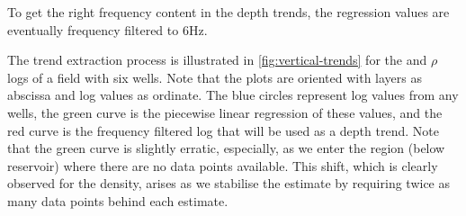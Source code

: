 To get the right frequency content in the depth trends, the regression
values are eventually frequency filtered to 6Hz.

The trend extraction process is illustrated in
\autoref{fig:vertical-trends} for the \vp and $\rho$ logs of a field
with six wells. Note that the plots are oriented with layers
as abscissa and log values as ordinate. The blue circles represent log
values from any wells, the green curve is the piecewise linear
regression of these values, and the red curve is the
frequency filtered log that will be used as a depth trend. Note that
the green curve is slightly erratic, especially, as we enter the
region (below reservoir) where there are no data points
available. This shift, which is clearly observed for the density,
arises as we stabilise the estimate by requiring twice as many data
points behind each estimate.

\renewcommand{\floatpagefraction}{0.60}

